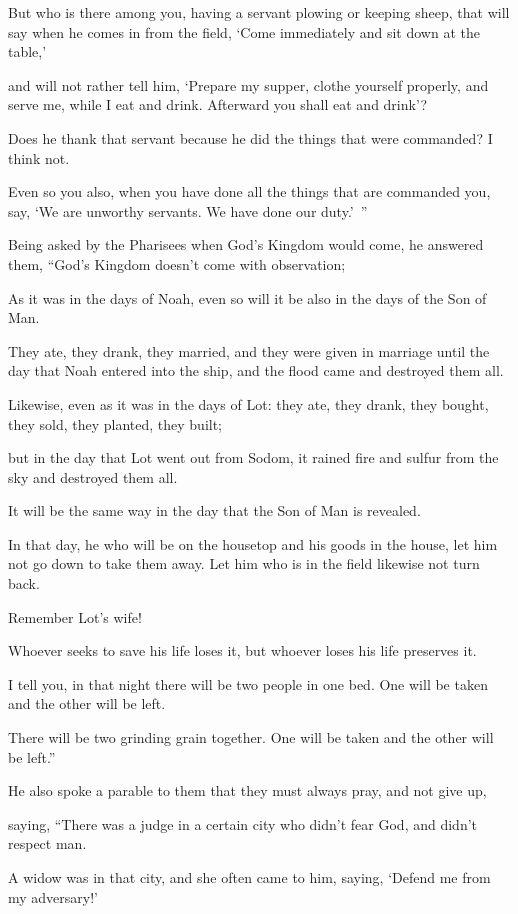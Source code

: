 But who is there among you, having a servant plowing or keeping sheep, that will say when he comes in from the field, ‘Come immediately and sit down at the table,’

and will not rather tell him, ‘Prepare my supper, clothe yourself properly, and serve me, while I eat and drink. Afterward you shall eat and drink’?

Does he thank that servant because he did the things that were commanded? I think not.

Even so you also, when you have done all the things that are commanded you, say, ‘We are unworthy servants. We have done our duty.’ ”

Being asked by the Pharisees when God’s Kingdom would come, he answered them, “God’s Kingdom doesn’t come with observation;

As it was in the days of Noah, even so will it be also in the days of the Son of Man.

They ate, they drank, they married, and they were given in marriage until the day that Noah entered into the ship, and the flood came and destroyed them all.

Likewise, even as it was in the days of Lot: they ate, they drank, they bought, they sold, they planted, they built;

but in the day that Lot went out from Sodom, it rained fire and sulfur from the sky and destroyed them all.

It will be the same way in the day that the Son of Man is revealed.

In that day, he who will be on the housetop and his goods in the house, let him not go down to take them away. Let him who is in the field likewise not turn back.

Remember Lot’s wife!

Whoever seeks to save his life loses it, but whoever loses his life preserves it.

I tell you, in that night there will be two people in one bed. One will be taken and the other will be left.

There will be two grinding grain together. One will be taken and the other will be left.”

He also spoke a parable to them that they must always pray, and not give up,

saying, “There was a judge in a certain city who didn’t fear God, and didn’t respect man.

A widow was in that city, and she often came to him, saying, ‘Defend me from my adversary!’

